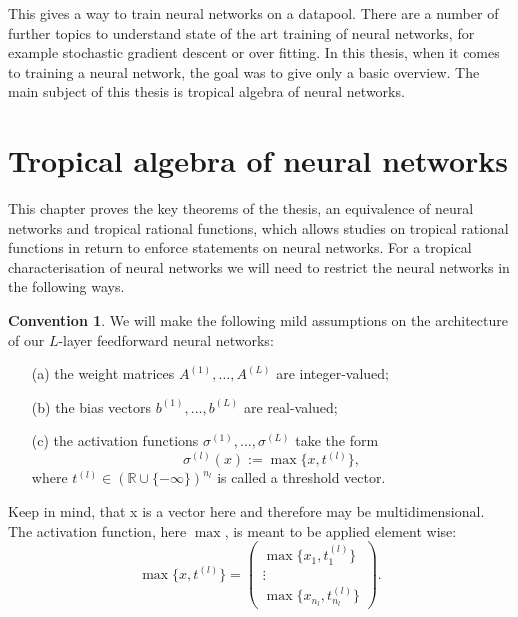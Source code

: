 \documentclass{article}
\theoremstyle{definition}
\newtheorem{remark}[theorem]{Remark}
\newtheorem{convention}[theorem]{Convention}
\begin{document}

This gives a way to train neural networks on a datapool. There are a number of further topics to understand state of the art training of neural networks, for example stochastic gradient descent or over fitting. In this thesis, when it comes to training a neural network, the goal was to give only a basic overview. The main subject of this thesis is tropical algebra of neural networks.
\newpage

\section{Tropical algebra of neural networks}\label{sec:trop_netw}

This chapter proves the key theorems of the thesis, an equivalence of neural networks and tropical rational functions, which allows studies on tropical rational functions in return to enforce statements on neural networks. For a tropical characterisation of neural networks we will need to restrict the neural networks in the following ways.

\begin{convention}\hspace{1sp}\cite{zhang2018tropical}
We will make the following mild assumptions
on the architecture of our $L$-layer feedforward neural networks:
\begin{itemize}
\item[(a)]
the weight matrices $A^{(1)} , \dots , A^{(L)}$ are integer-valued;
\item[(b)]
the bias vectors $b^{(1)} , \dots , b^{(L)}$ are real-valued;
\item[(c)]
the activation functions $\sigma^{(1)} , \dots , \sigma^{(L)}$ take the form
$$\sigma^{(l)}(x) := \max\{x, t^{(l)}\},$$
where $t^{(l)} \in (\mathbb{R} \cup \{-\infty \})^{n_l}$ is called a threshold vector.
\end{itemize}
Keep in mind, that x is a vector here and therefore may be multidimensional. The activation function, here $\max$, is meant to be applied element wise:
$$\max\{x, t^{(l)}\}=\begin{pmatrix}\max\{x_1, t^{(l)}_1 \}\\ \vdots \\ \max\{x_{n_l}, t^{(l)}_{n_l} \}\end{pmatrix}.$$
\end{convention}
\end{document}
